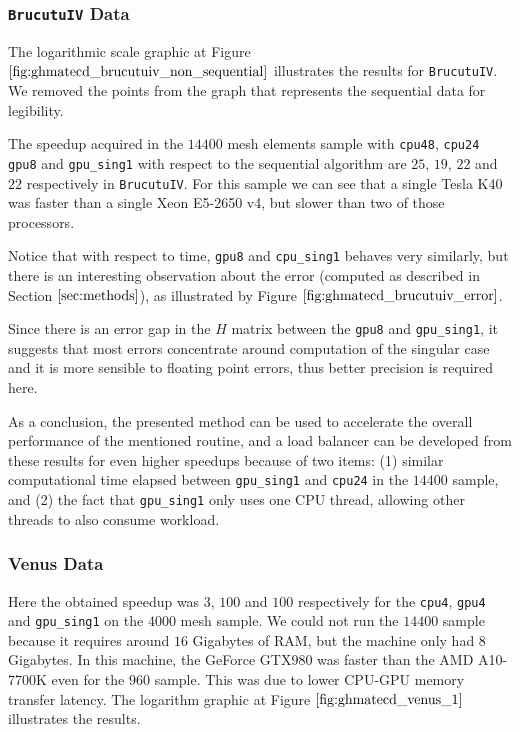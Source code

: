 \subsubsection{\texttt{BrucutuIV} Data}

The logarithmic scale graphic at Figure $\ref{fig:ghmatecd_brucutuiv_non_sequential}$ illustrates the
results for \texttt{BrucutuIV}. We removed the points from the graph that represents the sequential data for legibility.

The speedup acquired in the $14400$ mesh elements sample with \texttt{cpu48}, \texttt{cpu24} 
\texttt{gpu8} and \texttt{gpu\_sing1} with respect to the sequential algorithm are 
$25$, $19$, $22$ and $22$ respectively in \texttt{BrucutuIV}. For this sample we can see that a single Tesla K40
was faster than a single Xeon E5-2650 v4, but slower than two of those processors.

Notice that with respect to time, \texttt{gpu8} and \texttt{cpu\_sing1} behaves very similarly, 
but there is an interesting observation about the error (computed as described in Section $\ref{sec:methods}$), as illustrated by 
Figure $\ref{fig:ghmatecd_brucutuiv_error}$. 

Since there is an error gap in the $H$ matrix between the \texttt{gpu8} and \texttt{gpu\_sing1}, it suggests that most 
errors concentrate around computation of the singular case and it is more sensible to floating point errors, thus better 
precision is required here.

As a conclusion, the presented method can be used to accelerate the overall performance of the mentioned routine, 
and a load balancer can be developed from these results for even higher speedups because of two items: (1) similar 
computational time elapsed between \texttt{gpu\_sing1} and \texttt{cpu24} in the $14400$ sample, and (2) 
the fact that \texttt{gpu\_sing1} only uses one CPU thread, allowing other threads to also consume workload.

\subsubsection{Venus Data}

Here the obtained speedup was $3$, $100$ and $100$ respectively for the \texttt{cpu4}, 
\texttt{gpu4} and \texttt{gpu\_sing1} on the $4000$ mesh sample. We could not run the $14400$ 
sample because it requires around $16$ Gigabytes of RAM, but the machine only had $8$ Gigabytes.
In this machine, the GeForce GTX980 was faster than the AMD A10-7700K even for the 960 sample. This was due to 
lower CPU-GPU memory transfer latency. The logarithm graphic at 
Figure $\ref{fig:ghmatecd_venus_1}$ illustrates the results.

